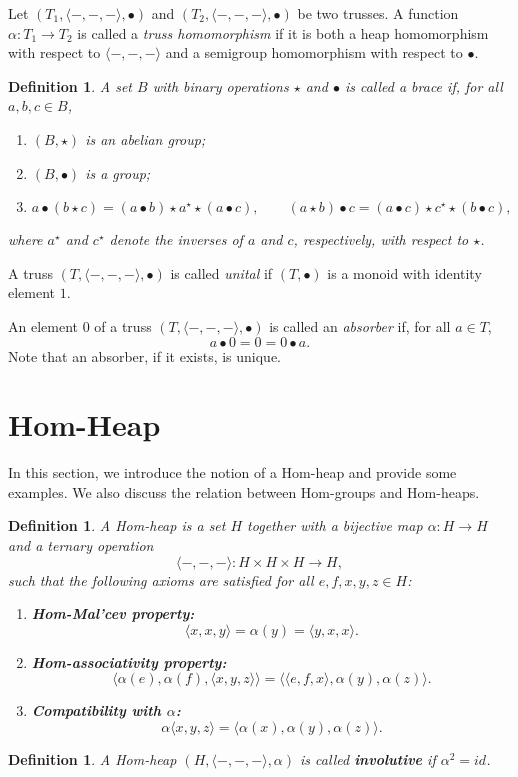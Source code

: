 \documentclass[14pt]{article}
\theoremstyle{Definition}
\newtheorem{Def}[thm]{Definition}
\theoremstyle{remark}
\begin{document}
Let $(T_{1},\langle-,-,-\rangle,\bullet)$ and $(T_{2},\langle-,-,-\rangle,\bullet)$ be two trusses.  
A function $\alpha:T_{1}\to T_{2}$ is called a \emph{truss homomorphism} if it is both a heap homomorphism with respect to $\langle-,-,-\rangle$ and a semigroup homomorphism with respect to $\bullet$.

\begin{Def}\cite{Rum}
A set $B$ with binary operations $\star$ and $\bullet$ is called a \emph{brace} if, for all $a,b,c \in B$,
\begin{enumerate}
\item[(i)] $(B,\star)$ is an abelian group;
\item[(ii)] $(B,\bullet)$ is a group;
\item[(iii)] 
\[
a \bullet (b \star c) = (a \bullet b) \star a^{\star} \star (a \bullet c), 
\qquad
(a \star b) \bullet c = (a \bullet c) \star c^{\star} \star (b \bullet c),
\]
\end{enumerate}
where $a^{\star}$ and $c^{\star}$ denote the inverses of $a$ and $c$, respectively, with respect to $\star$.
\end{Def}


A truss $(T,\langle -,-,- \rangle,\bullet)$ is called \emph{unital} if $(T,\bullet)$ is a monoid with identity element $1$.

An element $0$ of a truss $(T,\langle -,-,- \rangle,\bullet)$ is called an \emph{absorber} if, for all $a\in T$,
\[
a\bullet 0 = 0 = 0\bullet a.
\]
Note that an absorber, if it exists, is unique.


\section{Hom-Heap}
In this section, we introduce the notion of a Hom-heap and provide some examples. We also discuss the relation between Hom-groups and Hom-heaps.

\begin{Def}
A \emph{Hom-heap} is a set $H$ together with a bijective map $\alpha:H \to H$ and a ternary operation 
\[
\langle -,-,- \rangle : H \times H \times H \to H,
\]
such that the following axioms are satisfied for all $e,f,x,y,z \in H$:
\begin{enumerate}
\item[(i)] \textbf{Hom-Mal'cev property:}
\[
\langle x,x,y\rangle = \alpha(y) = \langle y,x,x\rangle.
\]
\item[(ii)] \textbf{Hom-associativity property:}
\[
\langle \alpha(e),\alpha(f),\langle x,y,z\rangle \rangle 
= \langle \langle e,f,x\rangle,\alpha(y),\alpha(z)\rangle.
\]
\item[(iii)] \textbf{Compatibility with $\alpha$:}
\[
\alpha\langle x,y,z\rangle = \langle \alpha(x),\alpha(y),\alpha(z)\rangle.
\]
\end{enumerate}
\end{Def}
\begin{Def}
A Hom-heap $(H, \langle -,-,- \rangle, \alpha)$ is called \textbf{involutive} if $\alpha^2 = id$.
\end{Def}
\end{document}
